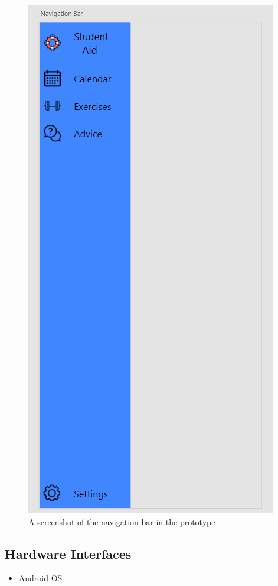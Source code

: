 \documentclass[a4paper]{article}
\begin{document}
\begin{figure}[h!]
	\includegraphics[scale=0.5]{NavBar.png}
	\caption{A screenshot of the navigation bar in the prototype}
	\label{fig:Prototype Navigation Bar}
\end{figure}

\subsection{Hardware Interfaces}
\begin{itemize}
	\item Android OS
\end{itemize}
\pagebreak
\end{document}
